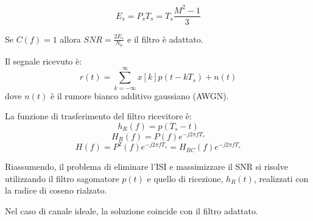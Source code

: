 \[
E_s = P_s T_s = T_s \frac{M^2-1}{3}
\]

Se \( C(f) = 1 \) allora \( SNR = \frac{2 E_s}{N_0} \) e il filtro è adattato.

Il segnale ricevuto è:
\[
r(t) = \sum_{k=-\infty}^{\infty} x[k] p(t - kT_s) + n(t)
\]
dove \( n(t) \) è il rumore bianco additivo gaussiano (AWGN).

La funzione di trasferimento del filtro ricevitore è:
\[
h_{R}(f) = p (T_s - t)
\]
\[
H_{R}(f) = P(f) e^{-j2\pi fT_s}
\]
\[
H(f) = P^2(f) e^{-j2\pi fT_s} = H_{RC}(f) e^{-j2\pi fT_s}
\]

Riassumendo, il problema di eliminare l'ISI e massimizzare il SNR si risolve utilizzando il filtro sagomatore \( p(t) \) e quello di ricezione, \( h_R(t) \), realizzati con la radice di coseno rialzato.

Nel caso di canale ideale, la soluzione coincide con il filtro adattato.
